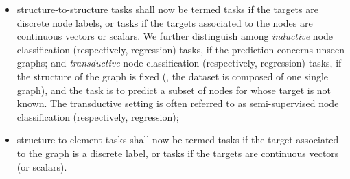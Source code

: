 \begin{itemize}
    \item structure-to-structure tasks shall now be termed  tasks if the targets are discrete node labels, or  tasks if the targets associated to the nodes are continuous vectors or scalars. We further distinguish among \emph{inductive} node classification (respectively, regression) tasks, if the prediction concerns unseen graphs; and \emph{transductive} node classification (respectively, regression) tasks, if the structure of the graph is fixed (\ie, the dataset is composed of one single graph), and the task is to predict a subset of nodes for whose target is not known. The transductive setting is often referred to as semi-supervised node classification (respectively, regression);
    \item structure-to-element tasks shall now be termed  tasks if the target associated to the graph is a discrete label, or  tasks if the targets are continuous vectors (or scalars).
\end{itemize}

